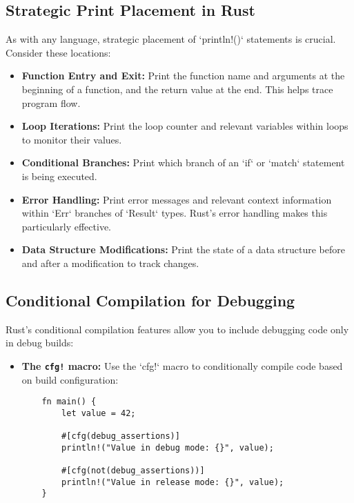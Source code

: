 \documentclass{article}
\begin{document}
{{{{\subsection*{Strategic Print Placement in Rust}

As with any language, strategic placement of `println!()` statements is crucial.  Consider these locations:

\begin{itemize}
    \item \textbf{Function Entry and Exit:} Print the function name and arguments at the beginning of a function, and the return value at the end. This helps trace program flow.
    \item \textbf{Loop Iterations:} Print the loop counter and relevant variables within loops to monitor their values.
    \item \textbf{Conditional Branches:} Print which branch of an `if` or `match` statement is being executed.
    \item \textbf{Error Handling:} Print error messages and relevant context information within `Err` branches of `Result` types. Rust's error handling makes this particularly effective.
    \item \textbf{Data Structure Modifications:} Print the state of a data structure before and after a modification to track changes.
\end{itemize}

\subsection*{Conditional Compilation for Debugging}

Rust's conditional compilation features allow you to include debugging code only in debug builds:

\begin{itemize}
    \item \textbf{The \texttt{cfg!} macro:} Use the `cfg!` macro to conditionally compile code based on build configuration:

    \begin{verbatim}
    fn main() {
        let value = 42;

        #[cfg(debug_assertions)]
        println!("Value in debug mode: {}", value);

        #[cfg(not(debug_assertions))]
        println!("Value in release mode: {}", value);
    }
    \end{verbatim}


\end{itemize}}}}}
\end{document}
